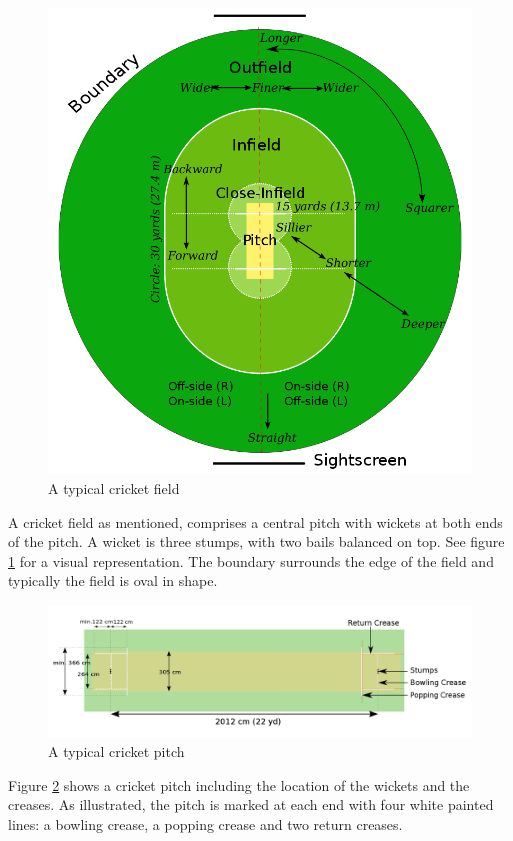 \documentclass[12pt,a4paper]{report}
\theoremstyle{definition}
\begin{document}
\begin{figure}[H]
    \centering
    \includegraphics[width=0.8\linewidth]{Cricket_Field.png}
    \caption{A typical cricket field \citep{cricketWiki}}
    \label{fig:CricketField}
\end{figure}

A cricket field as mentioned, comprises a central pitch with wickets at both ends of the pitch. 
A wicket is three stumps, with two bails balanced on top. 
See figure \ref{fig:CricketField} for a visual representation.
The boundary surrounds the edge of the field and typically the field is oval in shape.

\begin{figure}[H]
    \centering
    \includegraphics[width=0.8\linewidth]{Cricket_Pitch.png}
    \caption{A typical cricket pitch \citep{cricketWiki}}
    \label{fig:CricketPitch}
\end{figure}

Figure \ref{fig:CricketPitch} shows a cricket pitch including the location of the wickets and the creases.
As illustrated, the pitch is marked at each end with four white painted lines: a bowling crease, a popping crease and two return creases.
\end{document}
